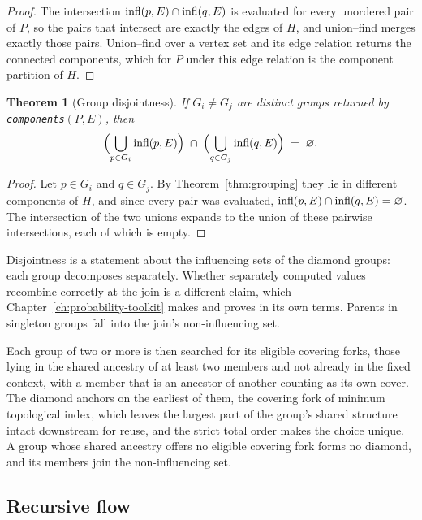 \documentclass[12pt]{report}
\newtheorem{theorem}{Theorem}
\begin{document}
\begin{proof}
The intersection $\mathrm{infl}(p,E) \cap \mathrm{infl}(q,E)$ is evaluated for every unordered pair of $P$, so the pairs that intersect are exactly the edges of $H$, and union--find merges exactly those pairs. Union--find over a vertex set and its edge relation returns the connected components, which for $P$ under this edge relation is the component partition of $H$.
\end{proof}

\begin{theorem}[Group disjointness]
\label{thm:disjoint}
If $G_i \neq G_j$ are distinct groups returned by \texttt{components}$(P,E)$, then
\[
\Bigl(\bigcup_{p\in G_i}\mathrm{infl}(p,E)\Bigr) \;\cap\; \Bigl(\bigcup_{q\in G_j}\mathrm{infl}(q,E)\Bigr) \;=\; \varnothing .
\]
\end{theorem}

\begin{proof}
Let $p \in G_i$ and $q \in G_j$. By Theorem~\ref{thm:grouping} they lie in different components of $H$, and since every pair was evaluated, $\mathrm{infl}(p,E) \cap \mathrm{infl}(q,E) = \varnothing$. The intersection of the two unions expands to the union of these pairwise intersections, each of which is empty.
\end{proof}

Disjointness is a statement about the influencing sets of the diamond groups: each group decomposes separately. Whether separately computed values recombine correctly at the join is a different claim, which Chapter~\ref{ch:probability-toolkit} makes and proves in its own terms. Parents in singleton groups fall into the join's non-influencing set.

Each group of two or more is then searched for its eligible covering forks, those lying in the shared ancestry of at least two members and not already in the fixed context, with a member that is an ancestor of another counting as its own cover. The diamond anchors on the earliest of them, the covering fork of minimum topological index, which leaves the largest part of the group's shared structure intact downstream for reuse, and the strict total order makes the choice unique. A group whose shared ancestry offers no eligible covering fork forms no diamond, and its members join the non-influencing set.

\subsection{Recursive flow}
\label{sec:dd-loop}
\end{document}
